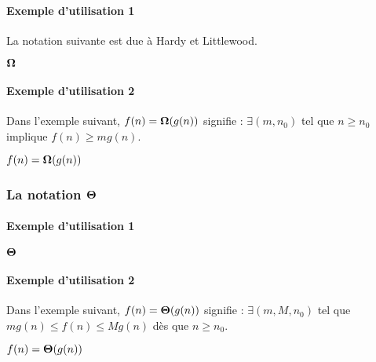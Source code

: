 \documentclass[12pt,a4paper]{article}
\theoremstyle{definition}
\begin{document}
\paragraph{Exemple d'utilisation 1}

La notation suivante est due à Hardy et Littlewood.

\begin{latexex}
$\bigomega{}$
\end{latexex}




\paragraph{Exemple d'utilisation 2}

Dans l'exemple suivant, $f(n) = \bigomega{g(n)}$ signifie :
$\exists (m, n_0)$ tel que $n \geqslant n_0$ implique $f(n) \geqslant m g(n)$.

\begin{latexex}
$f(n) = \bigomega{g(n)}$
\end{latexex}




\subsubsection{\texorpdfstring{La notation $\bigtheta{}$}%
                              {La notation "grand Theta"}}

\paragraph{Exemple d'utilisation 1}

\begin{latexex}
$\bigtheta{}$
\end{latexex}




\paragraph{Exemple d'utilisation 2}

Dans l'exemple suivant, $f(n) = \bigtheta{g(n)}$ signifie : $\exists (m, M, n_0)$ tel que $m g(n) \leqslant f(n) \leqslant M g(n)$ dès que $n \geqslant n_0$.

\begin{latexex}
$f(n) = \bigtheta{g(n)}$
\end{latexex}
\end{document}
